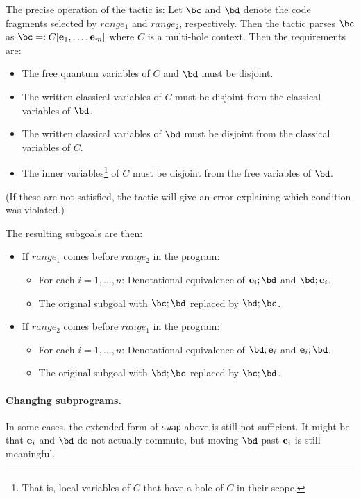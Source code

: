 \documentclass{article}
\begin{document}
The precise operation of the tactic is:
Let $\bc$ and $\bd$ denote the code fragments selected by $\mathit{range_1}$ and $\mathit{range_2}$, respectively.
Then the tactic parses $\bc$ as $\bc=:C[\be_1,\dots,\be_m]$ where $C$ is a multi-hole context. Then the requirements are:
\begin{itemize}
\item The free quantum variables of $C$ and $\bd$ must be disjoint.
\item The written classical variables of $C$ must be disjoint from the classical variables of $\bd$.
\item The written classical variables of $\bd$ must be disjoint from the classical variables of $C$.
\item The inner variables\footnote{That is, local variables of $C$ that have a hole of $C$ in their scope.} of $C$ must be disjoint from the free variables of $\bd$.
\end{itemize}
(If these are not satisfied, the tactic will give an error explaining which condition was violated.)

The resulting subgoals are then:
\begin{itemize}
\item If $\mathit{range_1}$ comes before $\mathit{range_2}$ in the program:
  \begin{itemize}
  \item For each $i=1,\dots,n$: Denotational equivalence of  ${\be_i;\bd}$ and $\bd;\be_i$.
  \item The original subgoal with $\bc;\bd$ replaced by $\bd;\bc$.
  \end{itemize}
\item If $\mathit{range_2}$ comes before $\mathit{range_1}$ in the program:
  \begin{itemize}
  \item For each $i=1,\dots,n$: Denotational equivalence of   $\bd;\be_i$ and ${\be_i;\bd}$.
  \item The original subgoal with $\bd;\bc$ replaced by $\bc;\bd$.
  \end{itemize}
\end{itemize}

\paragraph{Changing subprograms.}
In some cases, the extended form of \texttt{swap} above is still not sufficient.
It might be that $\mathbf e_i$ and $\bd$ do not actually commute, but moving $\bd$ past $\mathbf e_i$ is still meaningful.
\end{document}
